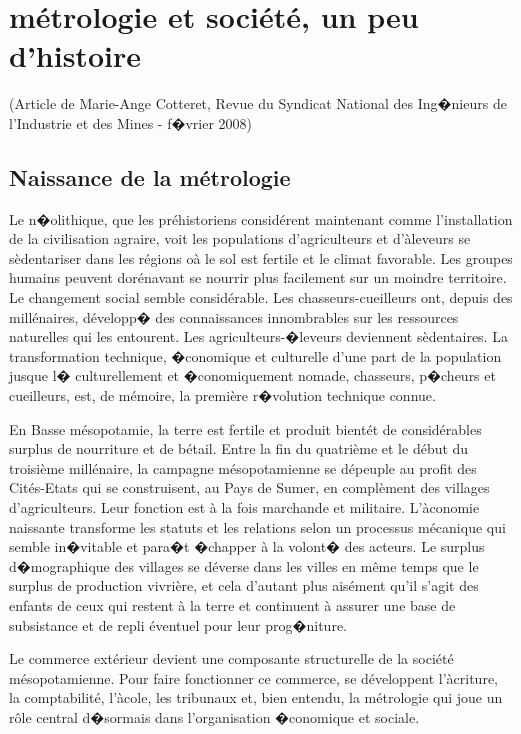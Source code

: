 \chapter{métrologie et société, un peu d'histoire}

(Article de Marie-Ange Cotteret, Revue du Syndicat National des Ing�nieurs de l'Industrie et des Mines - f�vrier 2008)

\sl

\section{Naissance de la métrologie}

Le n�olithique, que les préhistoriens considérent maintenant comme l'installation de la civilisation agraire, voit les populations d'agriculteurs et d'àleveurs se sèdentariser dans les régions oà le sol est fertile et le climat favorable. Les groupes humains peuvent dorénavant se nourrir plus facilement sur un moindre territoire.  Le changement social semble considérable. Les chasseurs-cueilleurs ont, depuis des millénaires, développ� des connaissances innombrables sur les ressources naturelles qui les entourent. Les agriculteurs-�leveurs deviennent sèdentaires.  La transformation technique, �conomique et culturelle d'une part de la population jusque l� culturellement et �conomiquement nomade, chasseurs, p�cheurs et cueilleurs, est, de mémoire, la première r�volution technique connue.

En Basse mésopotamie, la terre est fertile et produit bientét de considérables surplus de nourriture et de bétail. Entre la fin du quatrième et le début du troisième millénaire, la campagne mésopotamienne se dépeuple au profit des Cités-Etats qui se construisent, au Pays de Sumer, en complèment des villages d'agriculteurs.  Leur fonction est à la fois marchande et militaire.  L'àconomie naissante transforme les statuts et les relations selon un processus mécanique qui semble in�vitable et para�t �chapper à la volont� des acteurs. Le surplus d�mographique des villages se déverse dans les villes en même temps que le surplus de production vivrière, et cela d'autant plus aisément qu'il s'agit des enfants de ceux qui restent à la terre et continuent à assurer une base de subsistance et de repli éventuel pour leur prog�niture.

Le commerce extérieur devient une composante structurelle de la société mésopotamienne. Pour faire fonctionner ce commerce, se développent l'àcriture, la comptabilité, l'àcole, les tribunaux et, bien entendu, la métrologie qui joue un rôle central d�sormais dans l'organisation �conomique et sociale.

